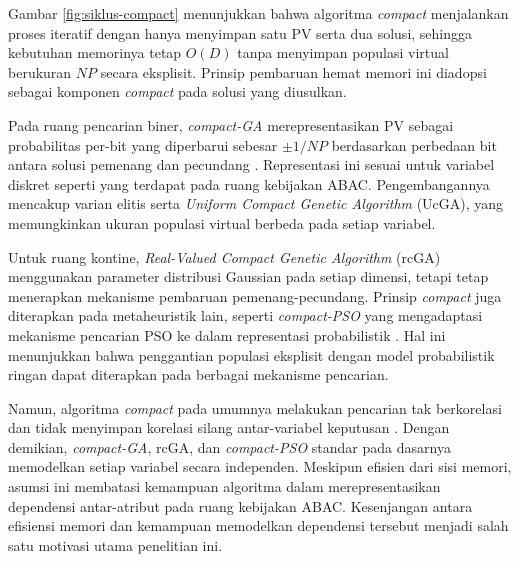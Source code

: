Gambar \ref{fig:siklus-compact} menunjukkan bahwa algoritma \textit{compact} menjalankan proses iteratif dengan hanya menyimpan satu PV serta dua solusi, sehingga kebutuhan memorinya tetap $O(D)$ tanpa menyimpan populasi virtual berukuran $NP$ secara eksplisit.
Prinsip pembaruan hemat memori ini diadopsi sebagai komponen \textit{compact} pada solusi yang diusulkan.

Pada ruang pencarian biner, \textit{compact-GA} merepresentasikan PV sebagai probabilitas per-bit yang diperbarui sebesar $\pm 1/NP$ berdasarkan perbedaan bit antara solusi pemenang dan pecundang \parencite{khalfi_metaheuristics_2023}.
Representasi ini sesuai untuk variabel diskret seperti yang terdapat pada ruang kebijakan ABAC.
Pengembangannya mencakup varian elitis serta \textit{Uniform Compact Genetic Algorithm} (UcGA)\label{first:ucga}, yang memungkinkan ukuran populasi virtual berbeda pada setiap variabel.

Untuk ruang kontine, \textit{Real-Valued Compact Genetic Algorithm} (rcGA)\label{first:rcga} menggunakan parameter distribusi Gaussian pada setiap dimensi, tetapi tetap menerapkan mekanisme pembaruan pemenang-pecundang.
Prinsip \textit{compact} juga diterapkan pada metaheuristik lain, seperti \textit{compact-PSO} yang mengadaptasi mekanisme pencarian PSO ke dalam representasi probabilistik \parencite{khalfi_metaheuristics_2023}.
Hal ini menunjukkan bahwa penggantian populasi eksplisit dengan model probabilistik ringan dapat diterapkan pada berbagai mekanisme pencarian.

Namun, algoritma \textit{compact} pada umumnya melakukan pencarian tak berkorelasi dan tidak menyimpan korelasi silang antar-variabel keputusan \parencite{khalfi_metaheuristics_2023}.
Dengan demikian, \textit{compact-GA}, rcGA, dan \textit{compact-PSO} standar pada dasarnya memodelkan setiap variabel secara independen.
Meskipun efisien dari sisi memori, asumsi ini membatasi kemampuan algoritma dalam merepresentasikan dependensi antar-atribut pada ruang kebijakan ABAC.
Kesenjangan antara efisiensi memori dan kemampuan memodelkan dependensi tersebut menjadi salah satu motivasi utama penelitian ini.